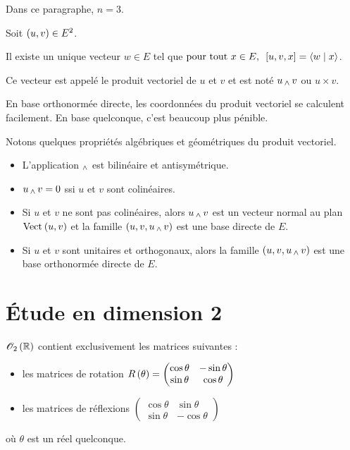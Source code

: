 Dans ce paragraphe, \(n=3\).

\begin{prop}
Soit \(\left(u,v\right)\in E^2\).

Il existe un unique vecteur \(w\in E\) tel que \(\quantifs{\tpt x\in E}\croch{u,v,x}=\ps{w}{x}\).

Ce vecteur est appelé le produit vectoriel de \(u\) et \(v\) et est noté \(u\operatorname{_\wedge} v\) ou \(u\times v\).
\end{prop}

En base orthonormée directe, les coordonnées du produit vectoriel se calculent facilement. En base quelconque, c'est beaucoup plus pénible.

Notons quelques propriétés algébriques et géométriques du produit vectoriel.

\begin{prop}
\begin{itemize}
    \item L'application \(\operatorname{_\wedge}\) est bilinéaire et antisymétrique. \\
    \item \(u\operatorname{_\wedge} v=0\) ssi \(u\) et \(v\) sont colinéaires. \\
    \item Si \(u\) et \(v\) ne sont pas colinéaires, alors \(u\operatorname{_\wedge} v\) est un vecteur normal au plan \(\Vect{u,v}\) et la famille \(\left(u,v,u\operatorname{_\wedge} v\right)\) est une base directe de \(E\). \\
    \item Si \(u\) et \(v\) sont unitaires et orthogonaux, alors la famille \(\left(u,v,u\operatorname{_\wedge} v\right)\) est une base orthonormée directe de \(E\).
\end{itemize}
\end{prop}

\section{Étude en dimension 2}

\begin{prop}
\(\Orth{2}[\R]\) contient exclusivement les matrices suivantes :

\begin{itemize}
    \item les matrices de rotation \(R\left(\theta\right)=\begin{pmatrix}
        \cos\theta & -\sin\theta \\
        \sin\theta & \cos\theta
    \end{pmatrix}\) \\
    \item les matrices de réflexions \(\begin{pmatrix}
        \cos\theta & \sin\theta \\
        \sin\theta & -\cos\theta
    \end{pmatrix}\)
\end{itemize}

où \(\theta\) est un réel quelconque.
\end{prop}

